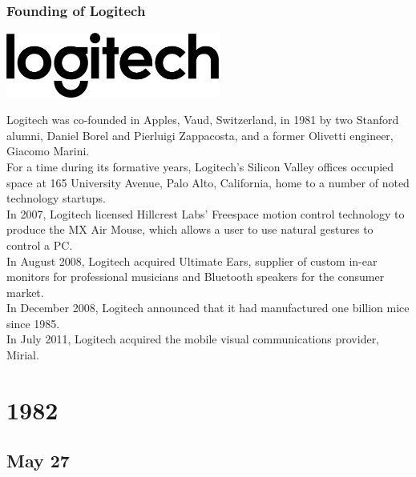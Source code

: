 \documentclass[11pt]{report}
\begin{document}
\subsection{Founding of Logitech}
\vspace{2mm}\begin{center}\includegraphics[width=7cm]{./img/logitechLogo.jpg}\end{center}
Logitech was co-founded in Apples, Vaud, Switzerland, in 1981 by two Stanford alumni, Daniel Borel and Pierluigi Zappacosta, and a former Olivetti engineer, Giacomo Marini.\\
\indent For a time during its formative years, Logitech's Silicon Valley offices occupied space at 165 University Avenue, Palo Alto, California, home to a number of noted technology startups.\\
\indent In 2007, Logitech licensed Hillcrest Labs' Freespace motion control technology to produce the MX Air Mouse, which allows a user to use natural gestures to control a PC.\\
\indent In August 2008, Logitech acquired Ultimate Ears, supplier of custom in-ear monitors for professional musicians and Bluetooth speakers for the consumer market.\\
\indent In December 2008, Logitech announced that it had manufactured one billion mice since 1985.\\
\indent In July 2011, Logitech acquired the mobile visual communications provider, Mirial.\\

\chapter{1982}
\section{May 27}
\end{document}

